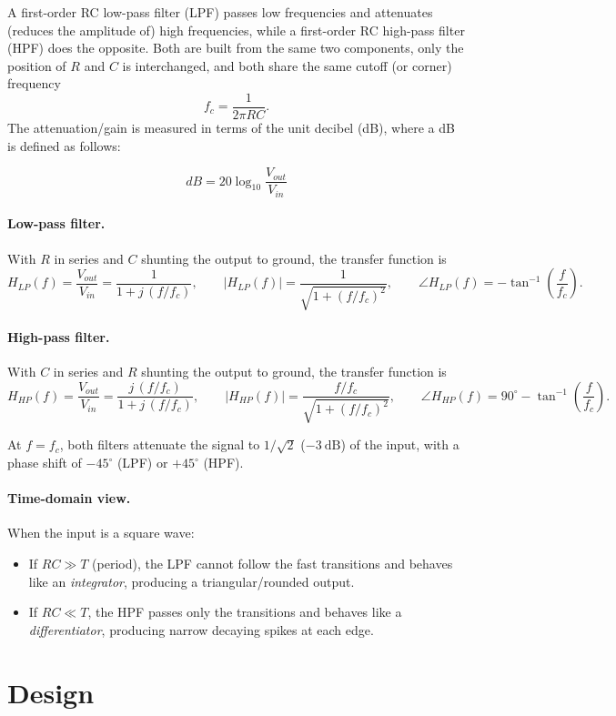 A first-order RC low-pass filter (LPF) passes low frequencies and attenuates (reduces the amplitude of)
high frequencies, while a first-order RC high-pass filter (HPF) does the
opposite. Both are built from the same two components, only the position of
$R$ and $C$ is interchanged, and both share the same cutoff (or corner)
frequency
\[
f_c = \frac{1}{2\pi R C}.
\]
The attenuation/gain is measured in terms of the unit decibel (dB), where a dB is defined as follows:

\[
dB = 20\log_{10}\frac{V_{out}}{V_{in}}
\]
\paragraph{Low-pass filter.} With $R$ in series and $C$ shunting the output
to ground, the transfer function is
\[
H_{LP}(f) = \frac{V_{out}}{V_{in}} = \frac{1}{1 + j\,(f/f_c)}, \qquad
|H_{LP}(f)| = \frac{1}{\sqrt{1+(f/f_c)^2}}, \qquad
\angle H_{LP}(f) = -\tan^{-1}\!\left(\frac{f}{f_c}\right).
\]

\paragraph{High-pass filter.} With $C$ in series and $R$ shunting the output
to ground, the transfer function is
\[
H_{HP}(f) = \frac{V_{out}}{V_{in}} = \frac{j\,(f/f_c)}{1 + j\,(f/f_c)}, \qquad
|H_{HP}(f)| = \frac{f/f_c}{\sqrt{1+(f/f_c)^2}}, \qquad
\angle H_{HP}(f) = 90^\circ - \tan^{-1}\!\left(\frac{f}{f_c}\right).
\]

At $f = f_c$, both filters attenuate the signal to $1/\sqrt{2}$ ($-3\ \text{dB}$)
of the input, with a phase shift of $-45^\circ$ (LPF) or $+45^\circ$ (HPF).

\paragraph{Time-domain view.} When the input is a square wave:
\begin{itemize}
	\item If $RC \gg T$ (period), the LPF cannot follow the fast transitions and
	behaves like an \emph{integrator}, producing a triangular/rounded output.
	\item If $RC \ll T$, the HPF passes only the transitions and behaves like a
	\emph{differentiator}, producing narrow decaying spikes at each edge.
\end{itemize}

\section{Design}

